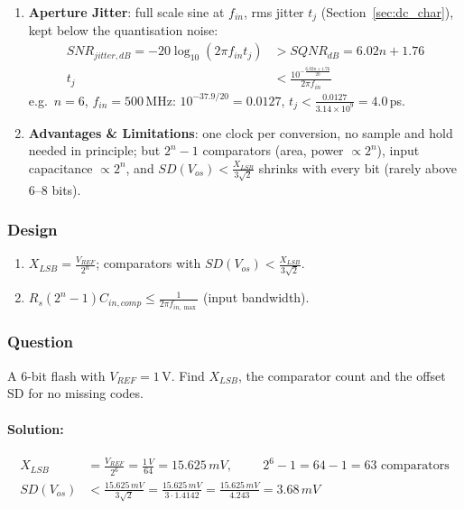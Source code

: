 \begin{enumerate}
    \paragraph{At Reference:} \(Z_{REF} = 2^n R\) (the string).
  \item \textbf{Aperture Jitter}: full scale sine at \(f_{in}\), rms jitter \(t_j\) (Section~\ref{sec:dc_char}), kept
    below the quantisation noise:
    \begin{align*}
      SNR_{jitter,dB} = -20\log_{10}(2\pi f_{in} t_j) &> SQNR_{dB} = 6.02n + 1.76 \\
      t_j &< \frac{10^{-\frac{6.02n + 1.76}{20}}}{2\pi f_{in}}
    \end{align*}
    e.g.\ \(n = 6\), \(f_{in} = 500\,\)MHz: \(10^{-37.9/20} = 0.0127\), \(t_j < \frac{0.0127}{3.14 \times 10^{9}} = 4.0\,\)ps.
  \item \textbf{Advantages \& Limitations}: one clock per conversion, no sample and hold needed in
    principle; but \(2^n - 1\) comparators (area, power \(\propto 2^n\)), input capacitance \(\propto 2^n\), and
    \(SD(V_{os}) < \frac{X_{LSB}}{3\sqrt{2}}\) shrinks with every bit (rarely above 6--8 bits).
\end{enumerate}

\subsubsection{Design}
\begin{enumerate}
  \item \(X_{LSB} = \frac{V_{REF}}{2^n}\); comparators with \(SD(V_{os}) < \frac{X_{LSB}}{3\sqrt{2}}\).
  \item \(R_s (2^n - 1) C_{in,comp} \leq \frac{1}{2\pi f_{in,\max}}\) (input bandwidth).
\end{enumerate}

\subsubsection{Question}
A 6-bit flash with \(V_{REF} = 1\,\)V. Find \(X_{LSB}\), the comparator count and
the offset SD for no missing codes.
\paragraph{Solution:}
\begin{align*}
  X_{LSB} &= \frac{V_{REF}}{2^6} = \frac{1\,V}{64} = 15.625\,mV, \hspace{1cm} 2^6 - 1 = 64 - 1 = 63 \text{ comparators} \\
  SD(V_{os}) &< \frac{15.625\,mV}{3\sqrt{2}} = \frac{15.625\,mV}{3 \cdot 1.4142} = \frac{15.625\,mV}{4.243} = 3.68\,mV
\end{align*}

